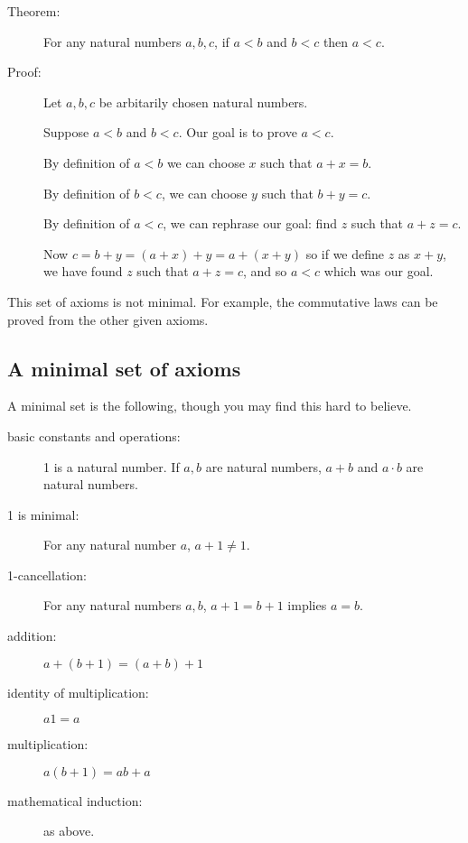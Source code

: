 \documentclass[12pt]{article}
\begin{document}
\begin{description}

\item[Theorem:]  For any natural numbers $a,b,c$, if $a<b$ and $b<c$ then $a<c$.

\item[Proof:]

Let $a,b,c$ be arbitarily chosen natural numbers.

Suppose $a<b$ and $b<c$.  Our goal is to prove $a<c$.

By definition of $a<b$ we can choose $x$ such that $a+x=b$.

By definition of $b<c$, we can choose $y$ such that $b+y=c$.

By definition of $a<c$, we can rephrase our goal:  find $z$ such that $a+z=c$.

Now $c = b+y = (a+x)+y = a+(x+y)$ so if we define $z$ as $x+y$, we have found
$z$ such that $a+z=c$, and so $a<c$ which was our goal.

\end{description}

This set of axioms is not minimal.  For example, the commutative laws can be proved from the other given axioms.

\subsection{A minimal set of axioms}

A minimal set is the following, though you may find this hard to believe.

\begin{description}

\item[basic constants and operations:]  1 is a natural number.   If $a,b$ are natural numbers, $a+b$ and $a\cdot b$ are natural numbers.

\item[1 is minimal:]  For any natural number $a$, $a+1 \neq 1$.

\item[1-cancellation:]  For any natural numbers $a,b$, $a+1=b+1$ implies $a=b$.

\item[addition:]  $a+(b+1)=(a+b)+1$

\item[identity of multiplication:]  $a1 = a$

\item[multiplication:]  $a(b+1) = ab+a$

\item[mathematical induction:]  as above.

\end{description}
\end{document}
